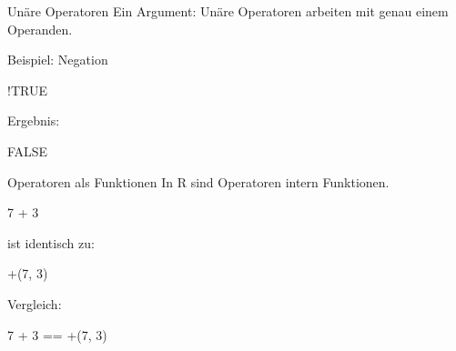 \documentclass[
  10pt,
  ignorenonframetext,
  aspectratio=169,
]{beamer}
\newenvironment{Shaded}{}{}
\newcommand{\AttributeTok}[1]{\textcolor[rgb]{0.49,0.56,0.16}{#1}}
\newcommand{\ConstantTok}[1]{\textcolor[rgb]{0.53,0.00,0.00}{#1}}
\newcommand{\DecValTok}[1]{\textcolor[rgb]{0.25,0.63,0.44}{#1}}
\newcommand{\NormalTok}[1]{#1}
\newcommand{\SpecialCharTok}[1]{\textcolor[rgb]{0.25,0.44,0.63}{#1}}
\newcommand{\StringTok}[1]{\textcolor[rgb]{0.25,0.44,0.63}{#1}}
\begin{document}
\begin{frame}[fragile]{Unäre Operatoren}
\label{unuxe4re-operatoren}
Ein Argument: Unäre Operatoren arbeiten mit genau einem Operanden.

Beispiel: Negation

\begin{Shaded}
\begin{Highlighting}[]
\SpecialCharTok{!}\ConstantTok{TRUE}
\end{Highlighting}
\end{Shaded}

Ergebnis:

\begin{Shaded}
\begin{Highlighting}[]
\ConstantTok{FALSE}
\end{Highlighting}
\end{Shaded}
\end{frame}

\begin{frame}[fragile]{Operatoren als Funktionen}
\label{operatoren-als-funktionen}
In R sind Operatoren intern Funktionen.

\begin{Shaded}
\begin{Highlighting}[]
\DecValTok{7} \SpecialCharTok{+} \DecValTok{3}
\end{Highlighting}
\end{Shaded}

ist identisch zu:

\begin{Shaded}
\begin{Highlighting}[]
\StringTok{\textasciigrave{}}\AttributeTok{+}\StringTok{\textasciigrave{}}\NormalTok{(}\DecValTok{7}\NormalTok{, }\DecValTok{3}\NormalTok{)}
\end{Highlighting}
\end{Shaded}

Vergleich:

\begin{Shaded}
\begin{Highlighting}[]
\DecValTok{7} \SpecialCharTok{+} \DecValTok{3} \SpecialCharTok{==} \StringTok{\textasciigrave{}}\AttributeTok{+}\StringTok{\textasciigrave{}}\NormalTok{(}\DecValTok{7}\NormalTok{, }\DecValTok{3}\NormalTok{)}
\end{Highlighting}
\end{Shaded}
\end{frame}
\end{document}

